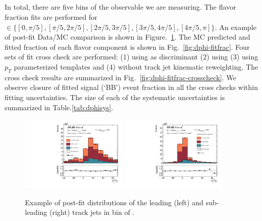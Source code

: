 \clearpage
\subsection{\dphi}

In total, there are five bins of the \dphi observable we are measuring. The flavor fraction fits are performed for \dphi $\in\{[0, \pi/5], [\pi/5, 2\pi/5], [2\pi/5, 3\pi/5], [3\pi/5, 4\pi/5], [4\pi/5, \pi]\}$. An example of post-fit Data/MC comparison is shown in Figure.~\ref{fig:dphi-fit-example}. The MC predicted and fitted fraction of each flavor component is shown in Fig.~\ref{fig:dphi-fitfrac}. Four sets of fit cross check are performed: (1) using \sdzero as discriminant (2) using \subsubsdzero (3) using $p_T$ parameterized templates and (4) without track jet kinematic reweighting. The cross check results are summarized in Fig.~\ref{fig:dphi-fitfrac-crosscheck}. We observe closure of fitted signal (`BB') event fraction in all the cross checks within fitting uncertainties. The size of each of the systematic uncertainties is summarized in Table.\ref{tab:dphisys}.


\begin{figure}[htbp]
  \centering
 \includegraphics[width=0.45\textwidth]{figures/gbb/paperplots/Canv_Fit_dphi_LpT_INF_SpT_INF_coarse_x}
 \includegraphics[width=0.45\textwidth]{figures/gbb/paperplots/Canv_Fit_b0_25_dphi_0_3_LpT_INF_SpT_INF_coarse_y}
 \caption{Example of post-fit \subsdzero distributions of the leading (left) and sub-leading (right) track jets in bin of \dphi. }
  \label{fig:dphi-fit-example}
\end{figure}

